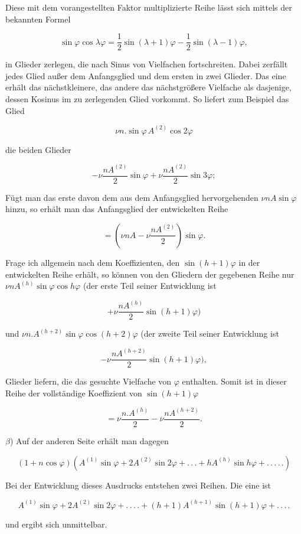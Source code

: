\par\noindent{}%
Diese mit dem vorangestellten Faktor multiplizierte Reihe lässt sich mittels der bekannten Formel

\[
\sin\varphi\cos\lambda\varphi=\frac{1}{2}\sin(\lambda+1)\varphi-\frac{1}{2}\sin(\lambda-1)\varphi,
\]

\noindent in Glieder zerlegen, die nach Sinus von Vielfachen fortschreiten. Dabei zerfällt jedes Glied außer dem Anfangsglied und dem ersten in zwei Glieder. Das eine erhält das nächstkleinere, das andere das nächstgrößere Vielfache als dasjenige, dessen Kosinus im zu zerlegenden Glied vorkommt. So liefert zum Beispiel das Glied

\[
\nu n . \sin\varphi\,A^{(2)}\cos2\varphi
\]

\noindent die beiden Glieder

\[
-\nu\frac{nA^{(2)}}{2}\sin\varphi+\nu\frac{nA^{(2)}}{2}\sin3\varphi;
\]

\noindent Fügt man das erste davon dem aus dem Anfangsglied hervorgehenden $\nu nA\sin\varphi$ hinzu, so erhält man das Anfangsglied der entwickelten Reihe

\[
=\left(\nu nA-\nu\frac{nA^{(2)}}{2}\right)\sin\varphi.
\]

Frage ich allgemein nach dem Koeffizienten, den $\sin(h+1)\varphi$ in der entwickelten Reihe erhält, so können von den Gliedern der gegebenen Reihe nur $\nu nA^{(h)}\sin\varphi\cos h\varphi$ (der erste Teil seiner Entwicklung ist

\[
+\nu\frac{nA^{(h)}}{2}\sin(h+1)\varphi)
\]

\noindent und $\nu n.A^{(h+2)}\sin\varphi\cos(h+2)\varphi$ (der zweite Teil seiner Entwicklung ist

\[
-\nu\frac{nA^{(h+2)}}{2}\sin(h+1)\varphi),
\]

\noindent Glieder liefern, die das gesuchte Vielfache von $\varphi$ enthalten. Somit ist in dieser Reihe der vollständige Koeffizient von $\sin(h+1)\varphi$

\[
=\nu\frac{n.A^{(h)}}{2}-\nu\frac{nA^{(h+2)}}{2}.
\]

$\beta$) Auf der anderen Seite erhält man dagegen

\[
(1+n\cos\varphi)\left(A^{(1)}\sin\varphi+2A^{(2)}\sin2\varphi+.\,.\,.+hA^{(h)}\sin h\varphi+.\,.\,.\,.\,.\right)
\]

\noindent Bei der Entwicklung dieses Ausdrucks entstehen zwei Reihen. Die eine ist

\[
A^{(1)}\sin\varphi+2A^{(2)}\sin2\varphi+.\,.\,.\,.+(h+1)A^{(h+1)}\sin(h+1)\varphi+.\,.\,.\,.
\]

\noindent und ergibt sich unmittelbar.
